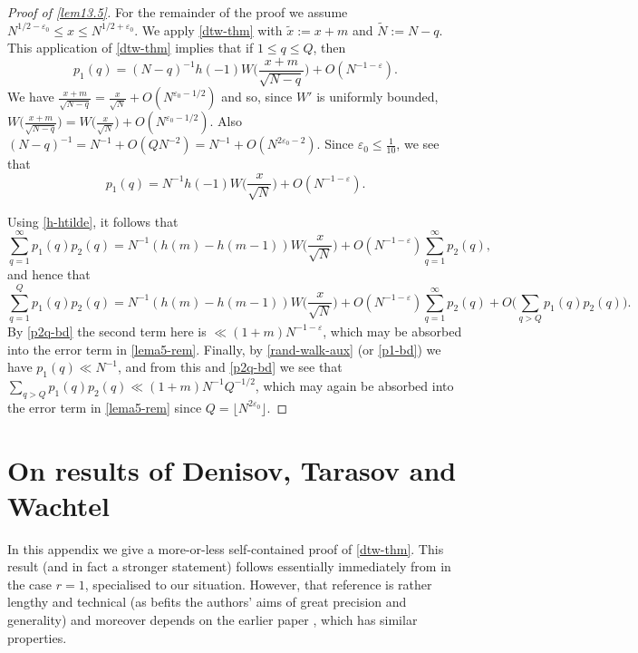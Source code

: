 \documentclass[11pt,reqno]{amsart}
\numberwithin{equation}{section}
\theoremstyle{definition}
\theoremstyle{remark}
\newcommand{\eps}{\varepsilon}
\renewcommand{\le}{\leqslant}
\begin{document}
\begin{proof}[Proof of \cref{lem13.5}]
For the remainder of the proof we assume $N^{1/2 - \eps_0} \le x \le N^{1/2 + \eps_0}$. We apply \cref{dtw-thm} with $\tilde x := x + m$ and $\tilde N := N - q$. This application of \cref{dtw-thm} implies that if $1 \le q \le Q$, then
\begin{equation*} p_1(q) =  (N - q)^{-1} h(-1)W\big( \frac{x + m}{\sqrt{N - q}}\big) + O(N^{-1 - \eps}).\end{equation*} We have $\frac{x + m}{\sqrt{N - q}} = \frac{x}{\sqrt{N}} + O(N^{\eps_0 - 1/2} )$ and so, since $W'$ is uniformly bounded, $W \big(\frac{x + m}{\sqrt{N - q}}\big) = W\big( \frac{x}{\sqrt{N}}\big) + O(N^{\eps_0 - 1/2})$. Also $(N - q)^{-1} = N^{-1} + O( QN^{-2}) = N^{-1} + O(N^{2\eps_0-2})$. Since $\eps_0 \le \frac{1}{10}$, we see that 
\begin{equation}\label{p1-bd} p_1(q) = N^{-1}h(-1) W\big(\frac{x}{\sqrt{N}}\big) + O(N^{-1  - \eps}).\end{equation}

Using \cref{h-htilde}, it follows that 
\[ \sum_{q = 1}^{\infty} p_1(q) p_2(q) = N^{-1} (h(m) - h(m-1)) W\big(\frac{x}{\sqrt{N}}\big) + O(N^{-1 - \eps}) \sum_{q = 1}^{\infty} p_2(q),\] and hence that 
\[ \sum_{q = 1}^{Q} p_1(q) p_2(q) = N^{-1} (h(m) - h(m-1)) W\big(\frac{x}{\sqrt{N}}\big) + O(N^{-1 - \eps}) \sum_{q = 1}^{\infty} p_2(q) + O\big( \sum_{q > Q} p_1(q) p_2(q)\big).\] 
By \cref{p2q-bd} the second term here is $\ll (1 + m) N^{-1 - \eps}$, which may be absorbed into the error term in \cref{lema5-rem}. Finally, by \cref{rand-walk-aux} (or \cref{p1-bd}) we have $p_1(q) \ll N^{-1}$, and from this and \cref{p2q-bd} we see that $\sum_{q > Q} p_1(q) p_2(q) \ll (1 + m) N^{-1} Q^{-1/2}$, which may again be absorbed into the error term in \cref{lema5-rem} since $Q = \lfloor N^{2\eps_0}\rfloor$.
\end{proof}


\section{On results of Denisov, Tarasov and Wachtel}\label{dtw-appendix}

In this appendix we give a more-or-less self-contained proof of \cref{dtw-thm}. This result (and in fact a stronger statement) follows essentially immediately from \cite[Theorem 1]{DTW24b} in the case $r = 1$, specialised to our situation. However, that reference is rather lengthy and technical (as befits the authors' aims of great precision and generality) and moreover depends on the earlier paper \cite{DTW24}, which has similar properties.
\end{document}
